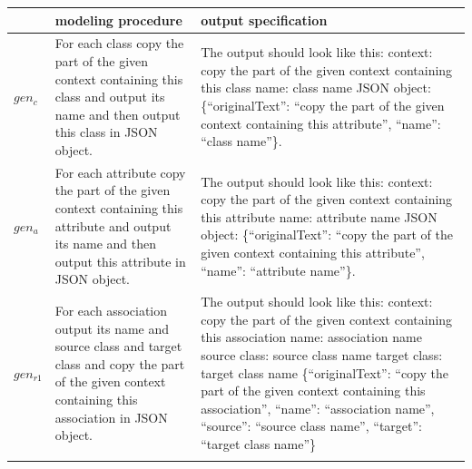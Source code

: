 \begin{table}[!h]
    \scriptsize
    \centering
    \setlength{\tabcolsep}{0.5em}
\begin{tabular}{@{}l>{\raggedright\arraybackslash}p{}>{\raggedright\arraybackslash}p{}@{}}
         & modeling procedure & output specification \\
    \toprule
    \addlinespace
$gen_c$ & For each class copy the part of the given context containing this class and output its name and then output this class in JSON object. & The output should look like this: \newline
context: copy the part of the given context containing this class \newline
name: class name \newline
JSON object: \{``originalText'': ``copy the part of the given context containing this attribute'', ``name'': ``class name''\}. \\
\addlinespace

$gen_a$ & For each attribute copy the part of the given context containing this attribute and output its name and then output this attribute in JSON object. & The output should look like this: \newline
context: copy the part of the given context containing this attribute \newline
name: attribute name \newline
JSON object: \{``originalText'': ``copy the part of the given context containing this attribute'', ``name'': ``attribute name''\}. \\
\addlinespace

$gen_{r1}$ & For each association output its name and source class and target class and copy the part of the given context containing this association in JSON object. &
The output should look like this: \newline
context: copy the part of the given context containing this association \newline
name: association name \newline
source class: source class name \newline
target class: target class name \newline
\{``originalText'': ``copy the part of the given context containing this association'', ``name'': ``association name'', ``source'': ``source class name'', ``target'': ``target class name''\} \\
\addlinespace


\end{tabular}
\end{table}

